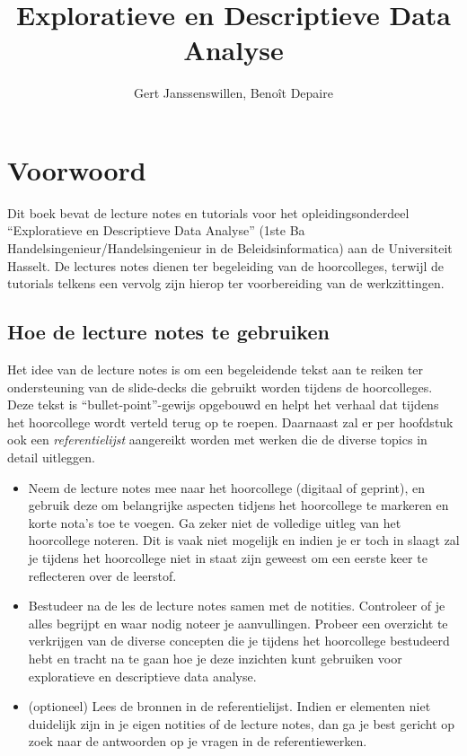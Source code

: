 \documentclass[]{tufte-book}
\title{Exploratieve en Descriptieve Data Analyse}
\author{Gert Janssenswillen, Benoît Depaire}
\date{}
\providecommand{\tightlist}{%
  \setlength{\itemsep}{0pt}\setlength{\parskip}{0pt}}
\begin{document}
\maketitle



{
\setcounter{tocdepth}{1}
\tableofcontents
}

\hypertarget{voorwoord}{%
\chapter*{Voorwoord}\label{voorwoord}}

Dit boek bevat de lecture notes en tutorials voor het opleidingsonderdeel ``Exploratieve en Descriptieve Data Analyse'' (1ste Ba Handelsingenieur/Handelsingenieur in de Beleidsinformatica) aan de Universiteit Hasselt. De lectures notes dienen ter begeleiding van de hoorcolleges, terwijl de tutorials telkens een vervolg zijn hierop ter voorbereiding van de werkzittingen.

\hypertarget{hoe-de-lecture-notes-te-gebruiken}{%
\section*{Hoe de lecture notes te gebruiken}\label{hoe-de-lecture-notes-te-gebruiken}}

Het idee van de lecture notes is om een begeleidende tekst aan te reiken ter ondersteuning van de slide-decks die gebruikt worden tijdens de hoorcolleges. Deze tekst is ``bullet-point''-gewijs opgebouwd en helpt het verhaal dat tijdens het hoorcollege wordt verteld terug op te roepen. Daarnaast zal er per hoofdstuk ook een \emph{referentielijst} aangereikt worden met werken die de diverse topics in detail uitleggen.

\begin{itemize}
\tightlist
\item
  Neem de lecture notes mee naar het hoorcollege (digitaal of geprint), en gebruik deze om belangrijke aspecten tidjens het hoorcollege te markeren en korte nota's toe te voegen. Ga zeker niet de volledige uitleg van het hoorcollege noteren. Dit is vaak niet mogelijk en indien je er toch in slaagt zal je tijdens het hoorcollege niet in staat zijn geweest om een eerste keer te reflecteren over de leerstof.
\item
  Bestudeer na de les de lecture notes samen met de notities. Controleer of je alles begrijpt en waar nodig noteer je aanvullingen. Probeer een overzicht te verkrijgen van de diverse concepten die je tijdens het hoorcollege bestudeerd hebt en tracht na te gaan hoe je deze inzichten kunt gebruiken voor exploratieve en descriptieve data analyse.
\item
  (optioneel) Lees de bronnen in de referentielijst. Indien er elementen niet duidelijk zijn in je eigen notities of de lecture notes, dan ga je best gericht op zoek naar de antwoorden op je vragen in de referentiewerken.
\end{itemize}
\end{document}
